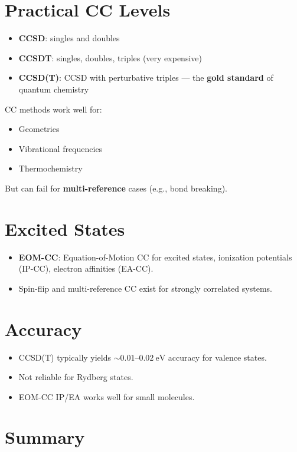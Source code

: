 \documentclass[12pt]{article}
\begin{document}
\section{Practical CC Levels}

\begin{itemize}
    \item \textbf{CCSD}: singles and doubles
    \item \textbf{CCSDT}: singles, doubles, triples (very expensive)
    \item \textbf{CCSD(T)}: CCSD with perturbative triples — the \textbf{gold standard} of quantum chemistry
\end{itemize}

CC methods work well for:
\begin{itemize}
    \item Geometries
    \item Vibrational frequencies
    \item Thermochemistry
\end{itemize}

\noindent
But can fail for \textbf{multi-reference} cases (e.g., bond breaking).

\section{Excited States}

\begin{itemize}
    \item \textbf{EOM-CC}: Equation-of-Motion CC for excited states, ionization potentials (IP-CC), electron affinities (EA-CC).
    \item Spin-flip and multi-reference CC exist for strongly correlated systems.
\end{itemize}

\section{Accuracy}

\begin{itemize}
    \item CCSD(T) typically yields \(\sim 0.01\)--\(0.02\ \mathrm{eV}\) accuracy for valence states.
    \item Not reliable for Rydberg states.
    \item EOM-CC IP/EA works well for small molecules.
\end{itemize}

\section{Summary}
\end{document}
